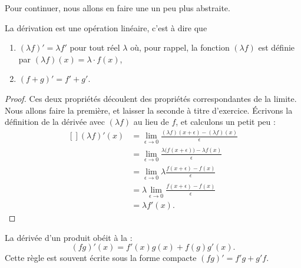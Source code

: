 Pour continuer, nous allons en faire une un peu plus abstraite.
\begin{proposition}     \label{PropDerrLin}
    La dérivation est une opération linéaire, c'est à dire que
    \begin{enumerate}
        \item $(\lambda f)'=\lambda f'$ pour tout réel $\lambda$ où, pour rappel, la fonction $(\lambda f)$ est définie par $(\lambda f)(x)=\lambda\cdot f(x)$,
        \item $(f+g)'=f'+g'$.
    \end{enumerate}
\end{proposition}

\begin{proof}
Ces deux propriétés découlent des propriétés correspondantes de la limite. Nous allons faire la première, et laisser la seconde à titre d'exercice. Écrivons la définition de la dérivée avec $(\lambda f)$ au lieu de $f$, et calculons un petit peu :
\begin{equation}
    \begin{aligned}[]
        (\lambda f)'(x) &=\lim_{\epsilon\to 0}\frac{ (\lambda f)(x+\epsilon)-(\lambda f)(x) }{ \epsilon }\\
                &=\lim_{\epsilon\to 0}\frac{ \lambda \big( f(x+\epsilon) \big)-\lambda f(x) }{ \epsilon }\\
                &=\lim_{\epsilon\to 0}\lambda \frac{ f(x+\epsilon) -f(x) }{ \epsilon }\\
                &=\lambda \lim_{\epsilon\to 0}\frac{ f(x+\epsilon) -f(x) }{ \epsilon }\\
                &=\lambda f'(x).
    \end{aligned}
\end{equation}
\end{proof}


\begin{proposition}
    La dérivée d'un produit obéit à la :
    \begin{equation}
        (fg)'(x)=f'(x)g(x)+f(g)g'(x).
    \end{equation}
    Cette règle est souvent écrite sous la forme compacte $(fg)'=f'g+g'f$.
\end{proposition}

